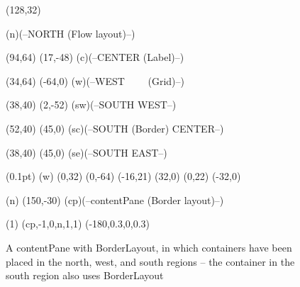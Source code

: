 


  
\begin {figure}

\Draw

\MinNodeSize(128,32)

\RectNode(n)(--NORTH
		(Flow layout)--)


\MinNodeSize(94,64)
\Move(17,-48)
\RectNode(c)(--CENTER
		(Label)--)

\MinNodeSize(34,64)
\Move(-64,0)
\RectNode(w)(--WEST~~~~  
		(Grid)--)

\MinNodeSize(38,40)
\Move(2,-52)
\RectNode(sw)(--SOUTH
		WEST--)

\MinNodeSize(52,40)
\Move(45,0)
\RectNode(sc)(--SOUTH
		(Border)
		CENTER--)

\MinNodeSize(38,40)
\Move(45,0)
\RectNode(se)(--SOUTH
		EAST--)

\PenSize(0.1pt)
\MoveToLoc(w)
\Move(0,32) \Line(0,-64)
\Move(-16,21) \Line(32,0)
\Move(0,22) \Line(-32,0)

\MoveToLoc(n)
\Move(150,-30)
\Node(cp)(--contentPane
	    (Border layout)--)

\ArrowHeads(1)
\CurvedEdgeAt(cp,-1,0,n,1,1)
	     (-180,0.3,0,0.3)



\EndDraw

\caption {A contentPane with BorderLayout, in which containers
have been placed in the north, west, and south regions -- the container
in the south region also uses BorderLayout}

\label {fig:nestedContainers}

\end {figure}


